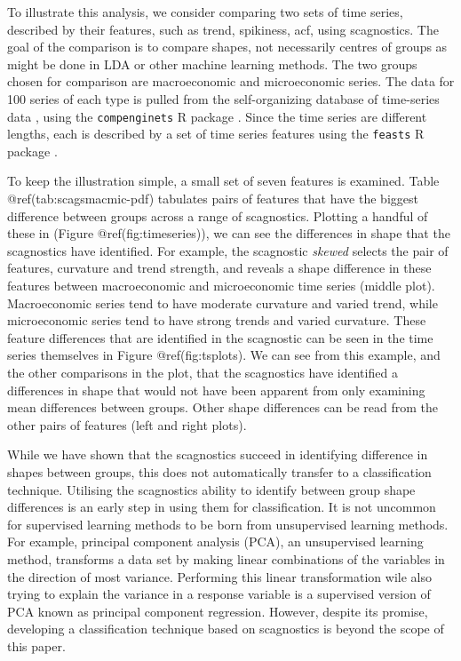 To illustrate this analysis, we consider comparing two sets of time
series, described by their features, such as trend, spikiness, acf,
using scagnostics. The goal of the comparison is to compare shapes, not
necessarily centres of groups as might be done in LDA or other machine
learning methods. The two groups chosen for comparison are macroeconomic
and microeconomic series. The data for 100 series of each type is pulled
from the self-organizing database of time-series data \citep{sots},
using the \texttt{compenginets} R package \citep{compenginets}. Since
the time series are different lengths, each is described by a set of
time series features \citep[chapter 4 of][]{fpp} using the
\texttt{feasts} R package \citep{feasts}.

To keep the illustration simple, a small set of seven features is
examined. Table @ref(tab:scagsmacmic-pdf) tabulates pairs of features
that have the biggest difference between groups across a range of
scagnostics. Plotting a handful of these in (Figure
@ref(fig:timeseries)), we can see the differences in shape that the
scagnostics have identified. For example, the scagnostic \emph{skewed}
selects the pair of features, curvature and trend strength, and reveals
a shape difference in these features between macroeconomic and
microeconomic time series (middle plot). Macroeconomic series tend to
have moderate curvature and varied trend, while microeconomic series
tend to have strong trends and varied curvature. These feature
differences that are identified in the scagnostic can be seen in the
time series themselves in Figure @ref(fig:tsplots). We can see from this
example, and the other comparisons in the plot, that the scagnostics
have identified a differences in shape that would not have been apparent
from only examining mean differences between groups. Other shape
differences can be read from the other pairs of features (left and right
plots).

While we have shown that the scagnostics succeed in identifying
difference in shapes between groups, this does not automatically
transfer to a classification technique. Utilising the scagnostics
ability to identify between group shape differences is an early step in
using them for classification. It is not uncommon for supervised
learning methods to be born from unsupervised learning methods. For
example, principal component analysis (PCA), an unsupervised learning
method, transforms a data set by making linear combinations of the
variables in the direction of most variance. Performing this linear
transformation wile also trying to explain the variance in a response
variable is a supervised version of PCA known as principal component
regression. However, despite its promise, developing a classification
technique based on scagnostics is beyond the scope of this paper.

